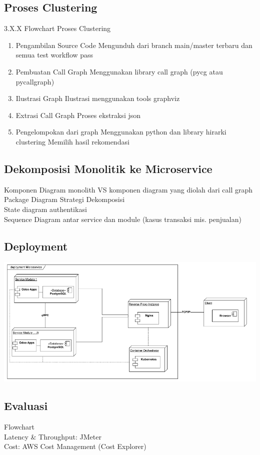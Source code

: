 \subsection{Proses Clustering}
3.X.X Flowchart Proses Clustering
\begin{enumerate}
  \item Pengambilan Source Code
Mengunduh dari branch main/master terbaru dan semua test workflow pass
\item Pembuatan Call Graph
Menggunakan library call graph (pycg atau pycallgraph)
\item Ilustrasi Graph
Ilustrasi menggunakan tools graphviz
\item Extrasi Call Graph
Proses ekstraksi json 
\item Pengelompokan dari graph
Menggunakan python dan library hirarki clustering 
Memilih hasil rekomendasi \\
\end{enumerate}

\subsection{Dekomposisi Monolitik ke Microservice}
Komponen Diagram monolith VS komponen diagram yang diolah dari call graph\\
Package Diagram Strategi Dekomposisi\\
State diagram authentikasi\\
Sequence Diagram antar service dan module (kasus transaksi mis. penjualan)\\

\subsection{Deployment}
\begin{center}
	\includegraphics[width=14cm]{img/Deployment.png}
	\label{fig:asd}
\end{center}

\subsection{Evaluasi}
Flowchart\\
Latency \& Throughput:  JMeter\\
Cost: AWS Cost Management (Cost Explorer)
